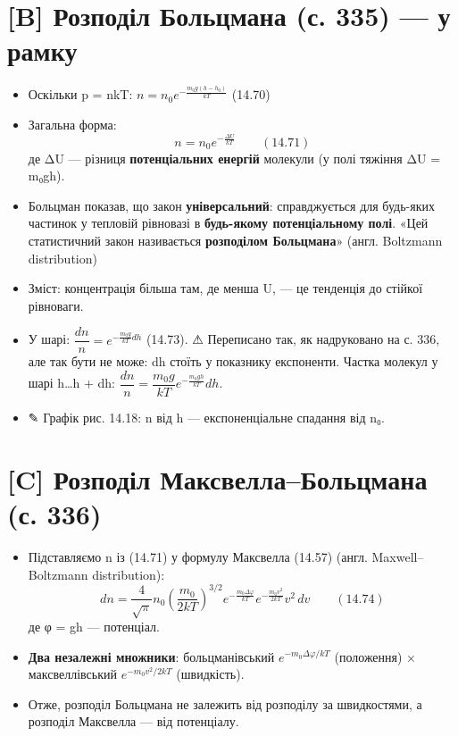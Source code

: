 \documentclass[11pt,a4paper,oneside]{book}
\newcommand{\pen}{{\sffamily\color{accent}✎}}
\newcommand{\warn}{{\sffamily\color{warncol}⚠}}
\begin{document}
\section*{[B] Розподіл Больцмана (с. 335) — у рамку}
\begin{itemize}
\item Оскільки p = nkT: $n = n_0e^{-\frac{m_0g(h-h_0)}{kT}}$ (14.70)
\item Загальна форма:
\[n = n_0e^{-\frac{\Delta U}{kT}}\qquad(14.71)\]
де ΔU — різниця \textbf{потенціальних енергій} молекули (у полі тяжіння ΔU = m₀gh).
\item Больцман показав, що закон \textbf{універсальний}: справджується для будь-яких частинок у тепловій рівновазі в \textbf{будь-якому потенціальному полі}. «Цей статистичний закон називається \textbf{розподілом Больцмана}» (англ. Boltzmann distribution)
\item Зміст: концентрація більша там, де менша U, — це тенденція до стійкої рівноваги.
\item У шарі: $\dfrac{dn}{n} = e^{-\frac{m_0g}{kT}dh}$ (14.73). \warn{} Переписано так, як надруковано на с. 336, але так бути не може: dh стоїть у показнику експоненти. Частка молекул у шарі h…h + dh: $\dfrac{dn}{n} = \dfrac{m_0g}{kT}e^{-\frac{m_0gh}{kT}}dh$.
\item \pen{} Графік рис. 14.18: n від h — експоненціальне спадання від n₀.
\end{itemize}

\section*{[C] Розподіл Максвелла–Больцмана (с. 336)}
\begin{itemize}
\item Підставляємо n із (14.71) у формулу Максвелла (14.57) (англ. Maxwell–Boltzmann distribution):
\[dn = \frac4{\sqrt\pi}n_0\left(\frac{m_0}{2kT}\right)^{3/2}e^{-\frac{m_0\Delta\varphi}{kT}}e^{-\frac{m_0v^2}{2kT}}v^2\,dv\qquad(14.74)\]
де φ = gh — потенціал.
\item \textbf{Два незалежні множники}: больцманівський $e^{-m_0\Delta\varphi/kT}$ (положення) × максвеллівський $e^{-m_0v^2/2kT}$ (швидкість).
\item Отже, розподіл Больцмана не залежить від розподілу за швидкостями, а розподіл Максвелла — від потенціалу.
\end{itemize}
\end{document}
